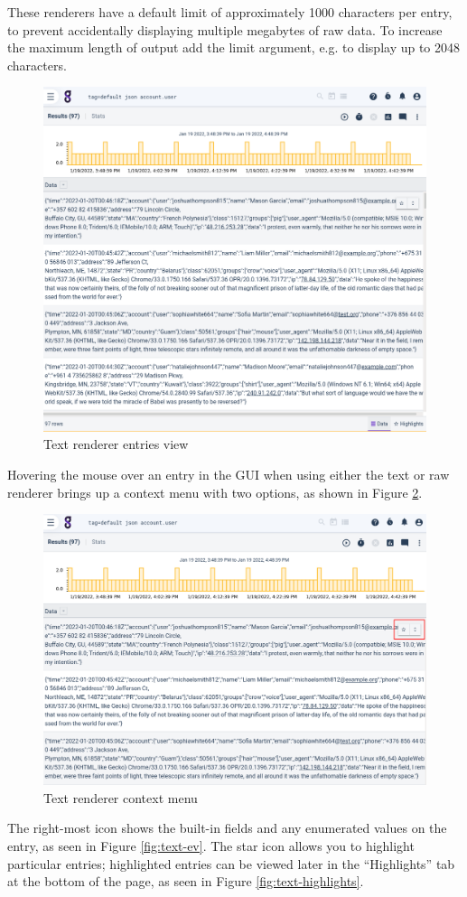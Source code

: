 These renderers have a default limit of approximately 1000 characters per
entry, to prevent accidentally displaying multiple megabytes of raw
data. To increase the maximum length of output add the limit argument, 
e.g.  to display up to 2048 characters.

\begin{figure}
	\includegraphics[width=0.7\linewidth]{images/text-entries.png}
	\caption{Text renderer entries view}
	\label{fig:text-entries}
\end{figure}

Hovering the mouse over an entry in the GUI when using either the text
or raw renderer brings up a context menu with two options, as shown
in Figure \ref{fig:text-context-menu}.

\begin{figure}
	\includegraphics[width=0.7\linewidth]{images/text-context-menu.png}
	\caption{Text renderer context menu}
	\label{fig:text-context-menu}
\end{figure}

The right-most icon shows the built-in fields and any enumerated values on the entry, as seen in Figure \ref{fig:text-ev}. The star icon allows you to highlight particular entries; highlighted entries can be viewed later in the ``Highlights'' tab at the bottom of the page, as seen in Figure \ref{fig:text-highlights}.

